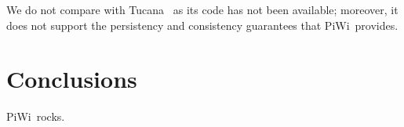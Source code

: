 \documentclass[letterpaper,twocolumn,10pt]{article}
\newcommand{\sys}{PiWi}
\begin{document}
We do not compare with Tucana~\cite{tucana} as its code has not been available; moreover, it does not support the persistency and consistency guarantees that \sys\ provides. 


\section{Conclusions}
\label{sec:conclusions}
\sys\ rocks.

%

{\normalsize 
}


\end{document}
